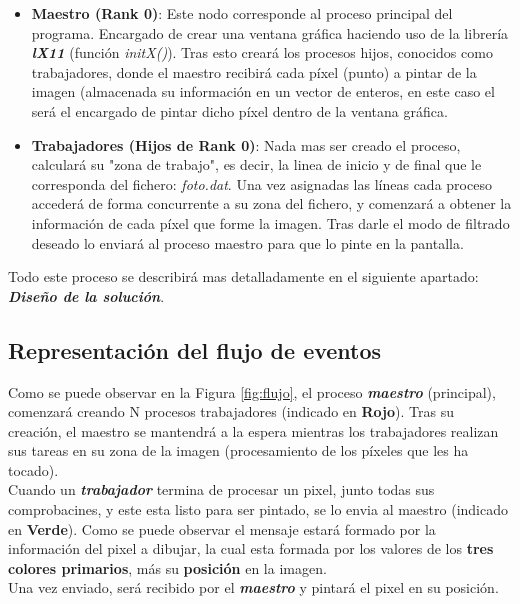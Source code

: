 \documentclass[11pt]{article}
\begin{document}
\begin{itemize}
	\item \textbf{Maestro (Rank 0)}: Este nodo corresponde al proceso principal del programa. Encargado de crear una ventana gráfica haciendo uso de la librería \textit{\textbf{lX11}} (función \textit{initX()}).
	Tras esto creará los procesos hijos, conocidos como trabajadores, donde el maestro recibirá cada píxel (punto) a pintar de la imagen (almacenada su información en un vector de enteros, en este caso el será el encargado de pintar dicho píxel dentro de la ventana gráfica.
	
	\item \textbf{Trabajadores (Hijos de Rank 0)}: Nada mas ser creado el proceso, calculará su "zona de trabajo", es decir, la linea de inicio y de final que le corresponda del fichero: \textit{foto.dat}.
	Una vez asignadas las líneas cada proceso accederá de forma concurrente a su zona del fichero, y comenzará a obtener la información de cada píxel que forme la imagen. Tras darle el modo de filtrado deseado lo enviará al proceso maestro para que lo pinte en la pantalla.
\end{itemize}

Todo este proceso se describirá mas detalladamente en el siguiente apartado: \textbf{\textit{Diseño de la solución}}.

\subsection{Representación del flujo de eventos}
Como se puede observar en la Figura \ref{fig:flujo}, el proceso \textbf{\textit{maestro}} (principal), comenzará creando N procesos trabajadores (indicado en \textbf{Rojo}). Tras su creación, el maestro se mantendrá a la espera mientras los trabajadores realizan sus tareas en su zona de la imagen (procesamiento de los píxeles que les ha tocado).\\

Cuando un \textbf{\textit{trabajador}} termina de procesar un pixel, junto todas sus comprobacines, y este esta listo para ser pintado, se lo envia al maestro (indicado en \textbf{Verde}). Como se puede observar el mensaje estará formado por la información del pixel a dibujar, la cual esta formada por los valores de los \textbf{tres colores primarios}, más su \textbf{posición} en la imagen.\\
Una vez enviado, será recibido por el \textbf{\textit{maestro}} y pintará el pixel en su posición.
\end{document}
